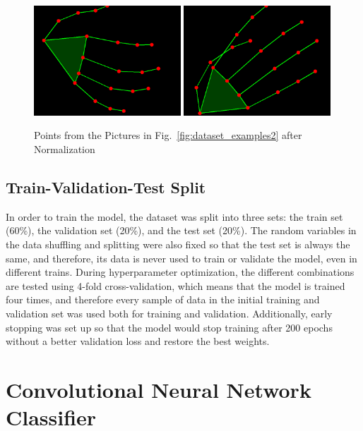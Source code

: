 \begin{figure}[H]
    \centerline{\includegraphics[width=0.49\textwidth]{figs/dataset_preprocessing3_1.png} \includegraphics[width=0.49\textwidth]{figs/dataset_preprocessing3_2.png}}
    \caption[Points from the Pictures in Fig.~\ref{fig:dataset_examples2} after Normalization]{Points from the Pictures in Fig.~\ref{fig:dataset_examples2} after Normalization}
    \label{fig:dataset_examples3}
\end{figure}

\subsection{Train-Validation-Test Split}

In order to train the model, the dataset was split into three sets: the train set (60\%), the validation set (20\%), and the test set (20\%). The random variables in the data shuffling and splitting were also fixed so that the test set is always the same, and therefore, its data is never used to train or validate the model, even in different trains. During hyperparameter optimization, the different combinations are tested using 4-fold cross-validation, which means that the model is trained four times, and therefore every sample of data in the initial training and validation set was used both for training and validation. Additionally, early stopping was set up so that the model would stop training after 200 epochs without a better validation loss and restore the best weights.

\section{Convolutional Neural Network Classifier}

